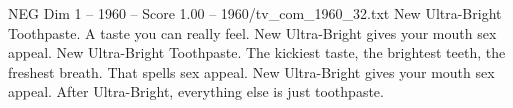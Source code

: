 \begin{textsample}{NEG Dim 1 – 1960 – Score 1.00 – 1960/tv\_com\_1960\_32.txt}  \label{ex:f1_neg_078}
New Ultra-Bright Toothpaste.
A taste you can really feel.
New Ultra-Bright gives your mouth sex appeal.
New Ultra-Bright Toothpaste.
The kickiest taste, the brightest teeth, the freshest breath.
That spells sex appeal.
New Ultra-Bright gives your mouth sex appeal.
After Ultra-Bright, everything else is just toothpaste.

\end{textsample}
